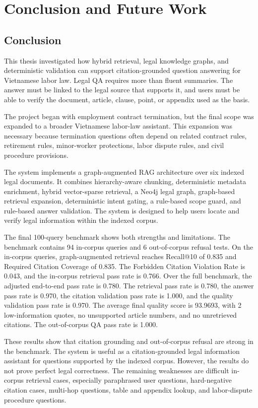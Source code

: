 \chapter{Conclusion and Future Work}

\section{Conclusion}
This thesis investigated how hybrid retrieval, legal knowledge graphs, and deterministic validation can support citation-grounded question answering for Vietnamese labor law. Legal QA requires more than fluent summaries. The answer must be linked to the legal source that supports it, and users must be able to verify the document, article, clause, point, or appendix used as the basis.

The project began with employment contract termination, but the final scope was expanded to a broader Vietnamese labor-law assistant. This expansion was necessary because termination questions often depend on related contract rules, retirement rules, minor-worker protections, labor dispute rules, and civil procedure provisions.

The system implements a graph-augmented RAG architecture over six indexed legal documents. It combines hierarchy-aware chunking, deterministic metadata enrichment, hybrid vector-sparse retrieval, a Neo4j legal graph, graph-based retrieval expansion, deterministic intent gating, a rule-based scope guard, and rule-based answer validation. The system is designed to help users locate and verify legal information within the indexed corpus.

The final 100-query benchmark shows both strengths and limitations. The benchmark contains 94 in-corpus queries and 6 out-of-corpus refusal tests. On the in-corpus queries, graph-augmented retrieval reaches Recall@10 of 0.835 and Required Citation Coverage of 0.835. The Forbidden Citation Violation Rate is 0.043, and the in-corpus retrieval pass rate is 0.766. Over the full benchmark, the adjusted end-to-end pass rate is 0.780. The retrieval pass rate is 0.780, the answer pass rate is 0.970, the citation validation pass rate is 1.000, and the quality validation pass rate is 0.970. The average final quality score is 93.9693, with 2 low-information quotes, no unsupported article numbers, and no unretrieved citations. The out-of-corpus QA pass rate is 1.000.

These results show that citation grounding and out-of-corpus refusal are strong in the benchmark. The system is useful as a citation-grounded legal information assistant for questions supported by the indexed corpus. However, the results do not prove perfect legal correctness. The remaining weaknesses are difficult in-corpus retrieval cases, especially paraphrased user questions, hard-negative citation cases, multi-hop questions, table and appendix lookup, and labor-dispute procedure questions.


